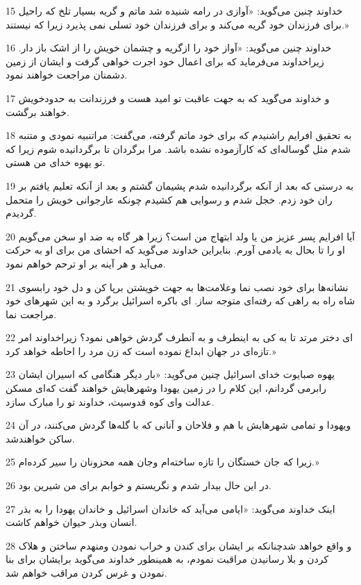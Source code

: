 \par 15 خداوند چنین می‌گوید: «آوازی در رامه شنیده شد ماتم و گریه بسیار تلخ که راحیل برای فرزندان خود گریه می‌کند و برای فرزندان خود تسلی نمی پذیرد زیرا که نیستند.»
\par 16 خداوند چنین می‌گوید: «آواز خود را ازگریه و چشمان خویش را از اشک باز دار. زیراخداوند می‌فرماید که برای اعمال خود اجرت خواهی گرفت و ایشان از زمین دشمنان مراجعت خواهند نمود.
\par 17 و خداوند می‌گوید که به جهت عاقبت تو امید هست و فرزندانت به حدودخویش خواهند برگشت.
\par 18 به تحقیق افرایم راشنیدم که برای خود ماتم گرفته، می‌گفت: مراتنبیه نمودی و متنبه شدم مثل گوساله‌ای که کارآزموده نشده باشد. مرا برگردان تا برگردانیده شوم زیرا که تو یهوه خدای من هستی.
\par 19 به درستی که بعد از آنکه برگردانیده شدم پشیمان گشتم و بعد از آنکه تعلیم یافتم بر ران خود زدم. خجل شدم و رسوایی هم کشیدم چونکه عارجوانی خویش را متحمل گردیدم.
\par 20 آیا افرایم پسر عزیز من یا ولد ابتهاج من است؟ زیرا هر گاه به ضد او سخن می‌گویم او را تا بحال به یادمی آورم. بنابراین خداوند می‌گوید که احشای من برای او به حرکت می‌آید و هر آینه بر او ترحم خواهم نمود.
\par 21 نشانه‌ها برای خود نصب نما وعلامت‌ها به جهت خویشتن برپا کن و دل خود رابسوی شاه راه به راهی که رفته‌ای متوجه ساز. ای باکره اسرائیل برگرد و به این شهرهای خود مراجعت نما.
\par 22 ‌ای دختر مرتد تا به کی به اینطرف و به آنطرف گردش خواهی نمود؟ زیراخداوند امر تازه‌ای در جهان ابداع نموده است که زن مرد را احاطه خواهد کرد.»
\par 23 یهوه صبایوت خدای اسرائیل چنین می‌گوید: «بار دیگر هنگامی که اسیران ایشان رابرمی گردانم، این کلام را در زمین یهودا وشهرهایش خواهند گفت که‌ای مسکن عدالت وای کوه قدوسیت، خداوند تو را مبارک سازد.
\par 24 ویهودا و تمامی شهرهایش با هم و فلاحان و آنانی که با گله‌ها گردش می‌کنند، در آن ساکن خواهندشد.
\par 25 زیرا که جان خستگان را تازه ساخته‌ام وجان همه محزونان را سیر کرده‌ام.»
\par 26 در این حال بیدار شدم و نگریستم و خوابم برای من شیرین بود.
\par 27 اینک خداوند می‌گوید: «ایامی می‌آید که خاندان اسرائیل و خاندان یهودا را به بذر انسان وبذر حیوان خواهم کاشت.
\par 28 و واقع خواهد شدچنانکه بر ایشان برای کندن و خراب نمودن ومنهدم ساختن و هلاک کردن و بلا رسانیدن مراقبت نمودم، به همینطور خداوند می‌گوید برایشان برای بنا نمودن و غرس کردن مراقب خواهم شد.
